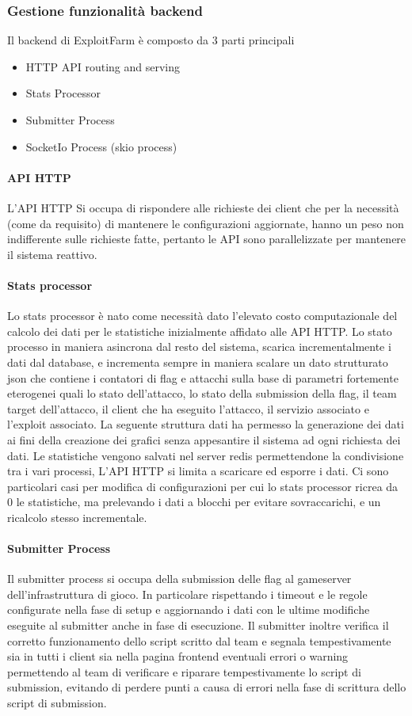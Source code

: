 \documentclass[11pt]{article}
\begin{document}
\subsubsection{Gestione funzionalità backend}
Il backend di ExploitFarm è composto da 3 parti principali
\begin{itemize}
	\item HTTP API routing and serving
	\item Stats Processor
	\item Submitter Process
	\item SocketIo Process (skio process)
\end{itemize}
\paragraph{API HTTP}
L'API HTTP Si occupa di rispondere alle richieste dei client che per la necessità (come da requisito) di mantenere le configurazioni aggiornate, hanno un peso non indifferente sulle richieste fatte, pertanto le API sono parallelizzate per mantenere il sistema reattivo.
\paragraph{Stats processor}
Lo stats processor è nato come necessità dato l'elevato costo computazionale del calcolo dei dati per le statistiche inizialmente affidato alle API HTTP. Lo stato processo in maniera asincrona dal resto del sistema, scarica incrementalmente i dati dal database, e incrementa sempre in maniera scalare un dato strutturato json che contiene i contatori di flag e attacchi sulla base di parametri fortemente eterogenei quali lo stato dell'attacco, lo stato della submission della flag, il team target dell'attacco, il client che ha eseguito l'attacco, il servizio associato e l'exploit associato. La seguente struttura dati ha permesso la generazione dei dati ai fini della creazione dei grafici senza appesantire il sistema ad ogni richiesta dei dati. Le statistiche vengono salvati nel server redis permettendone la condivisione tra i vari processi, L'API HTTP si limita a scaricare ed esporre i dati. Ci sono particolari casi per modifica di configurazioni per cui lo stats processor ricrea da 0 le statistiche, ma prelevando i dati a blocchi per evitare sovraccarichi, e un ricalcolo stesso incrementale.
\paragraph{Submitter Process}
Il submitter process si occupa della submission delle flag al gameserver dell'infrastruttura di gioco. In particolare rispettando i timeout e le regole configurate nella fase di setup e aggiornando i dati con le ultime modifiche eseguite al submitter anche in fase di esecuzione.
Il submitter inoltre verifica il corretto funzionamento dello script scritto dal team e segnala tempestivamente sia in tutti i client sia nella pagina frontend eventuali errori o warning permettendo al team di verificare e riparare tempestivamente lo script di submission, evitando di perdere punti a causa di errori nella fase di scrittura dello script di submission.
\end{document}
